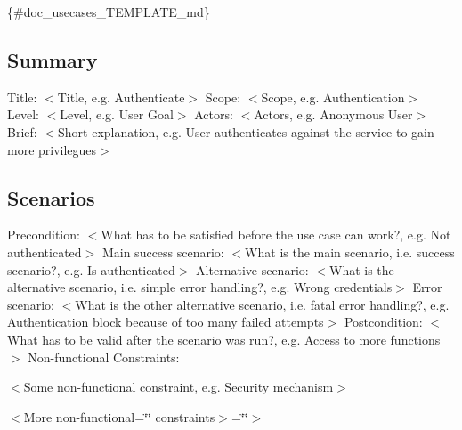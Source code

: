 \{\#doc\+\_\+usecases\+\_\+\+T\+E\+M\+P\+L\+A\+T\+E\+\_\+md\}

\subsection*{Summary}

Title\+: $<$Title, e.\+g. Authenticate$>$ Scope\+: $<$Scope, e.\+g. Authentication$>$ Level\+: $<$Level, e.\+g. User Goal$>$ Actors\+: $<$Actors, e.\+g. Anonymous User$>$ Brief\+: $<$Short explanation, e.\+g. User authenticates against the service to gain more privilegues$>$

\subsection*{Scenarios}

Precondition\+: $<$What has to be satisfied before the use case can work?, e.\+g. Not authenticated$>$ Main success scenario\+: $<$What is the main scenario, i.\+e. success scenario?, e.\+g. Is authenticated$>$ Alternative scenario\+: $<$What is the alternative scenario, i.\+e. simple error handling?, e.\+g. Wrong credentials$>$ Error scenario\+: $<$What is the other alternative scenario, i.\+e. fatal error handling?, e.\+g. Authentication block because of too many failed attempts$>$ Postcondition\+: $<$What has to be valid after the scenario was run?, e.\+g. Access to more functions$>$ Non-\/functional Constraints\+:
\begin{DoxyItemize}
\item $<$Some non-\/functional constraint, e.\+g. Security mechanism$>$
\item $<$\+More non-\/functional=\char`\"{}\char`\"{} constraints$>$=\char`\"{}\char`\"{}$>$ 
\end{DoxyItemize}